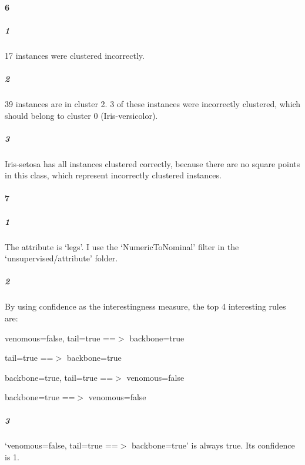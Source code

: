 \documentclass[22pt]{article}
\begin{document}
	\paragraph{6}
		\subparagraph{1} 17 instances were clustered incorrectly.

		\subparagraph{2} 39 instances are in cluster 2. 3 of these instances were incorrectly clustered, which should belong to cluster 0 (Iris-versicolor).

		\subparagraph{3} Iris-setosa has all instances clustered correctly, because there are no square points in this class, which represent incorrectly clustered instances.


 	\paragraph{7}
 		\subparagraph{1} The attribute is `legs'. I use the `NumericToNominal' filter in the `unsupervised\slash attribute' folder.

 		\subparagraph{2} By using confidence as the interestingness measure, the top 4 interesting rules are:

 		venomous=false, tail=true ==$>$ backbone=true

 		tail=true ==$>$ backbone=true 

 		backbone=true, tail=true ==$>$ venomous=false

 		backbone=true ==$>$ venomous=false  

 	 	\subparagraph{3} `venomous=false, tail=true ==$>$ backbone=true' is always true. Its confidence is 1.
 
\end{document}
